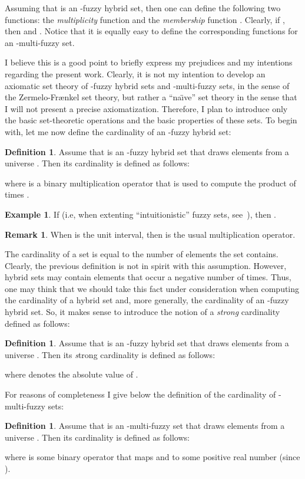 \documentclass{amsart}
\theoremstyle{definition}
\newtheorem{definition}[theorem]{Definition}
\newtheorem{example}[theorem]{Example}
\newtheorem{remark}[theorem]{Remark}
\begin{document}
Assuming that  is an -fuzzy hybrid set, then one can define 
the following two functions: the \textit{multiplicity} function 
 and the \textit{membership} 
function . Clearly, if 
, then   
and .
Notice that it is equally easy to define the corresponding functions for an
-multi-fuzzy set.

I believe this is a good point to briefly express my prejudices and my 
intentions regarding the present work. Clearly, it is not my intention to 
develop an axiomatic set theory of -fuzzy hybrid sets and -multi-fuzzy 
sets, in the sense of the Zermelo-Fr{\ae}nkel set theory, but rather a 
``na{\"\i}ve'' set theory in the sense that I will not present a precise 
axiomatization. Therefore, I plan to introduce only the basic set-theoretic 
operations and the basic properties of these sets. To begin with,
let me now define the cardinality of an -fuzzy hybrid set: 
\begin{definition}
Assume that  is an -fuzzy hybrid set that draws elements 
from a universe . Then its cardinality is defined as follows:

where  is a binary multiplication operator 
that is used to compute the product of  times .
\end{definition}
\begin{example}
If  (i.e, when extenting ``intuitionistic'' fuzzy sets, 
see~\cite{syropoulos2010}), 
then .
\end{example}
\begin{remark}
When  is the unit interval, then  is the usual multiplication operator.
\end{remark}

The cardinality of a set is equal to the number of elements the set contains. 
Clearly, the previous definition is not in spirit with this assumption. 
However, hybrid sets may contain elements that occur a negative number of 
times. Thus, one may think that we should take this fact under consideration 
when computing the cardinality of a hybrid set and, more generally, the 
cardinality of an -fuzzy hybrid set. So, it makes sense to
introduce the notion of a {\em strong} cardinality defined as follows:   
\begin{definition}
Assume that  is an -fuzzy hybrid set that draws elements from 
a universe . Then its {\emph strong} cardinality is defined as follows:

where  denotes the absolute value of 
. 
\end{definition}

For reasons of completeness I give below the definition of the cardinality of 
-multi-fuzzy sets:
\begin{definition}
Assume that  is an -multi-fuzzy set that draws elements from a 
universe . Then its cardinality is defined as follows:

where  is some binary operator that maps  and 
 to some positive real number (since ).
\end{definition}
\end{document}
